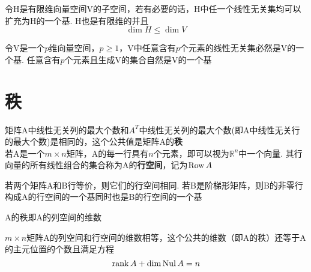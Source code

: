 \begin{TheoremOne}
令H是有限维向量空间V的子空间，若有必要的话，H中任一个线性无关集均可以扩充为H的一个基. H也是有限维的并且
\[\dim H\leqslant\dim V\]
\end{TheoremOne}\vspace{4ex}

\begin{TheoremTwo}[基定理]
令V是一个$p$维向量空间，$p\geqslant 1$，V中任意含有$p$个元素的线性无关集必然是V的一个基. 任意含有$p$个元素且生成V的集合自然是V的一个基
\end{TheoremTwo}\vspace{4ex}

{\par\centering
{}
\par}\vspace{4ex}

\section{秩}
矩阵A中线性无关列的最大个数和$A^T$中线性无关列的最大个数(即A中线性无关行的最大个数)是相同的，这个公共值是矩阵A的\textbf{秩}\\[2ex]

若A是一个$m\times n$矩阵，A的每一行具有$n$个元素，即可以视为$\mathbb{R}^n$中一个向量. 其行向量的所有线性组合的集合称为A的\textbf{行空间}，记为$\operatorname{Row} A$\\[2ex]

\begin{TheoremOne}
若两个矩阵A和B行等价，则它们的行空间相同. 若B是阶梯形矩阵，则B的非零行构成A的行空间的一个基同时也是B的行空间的一个基
\end{TheoremOne}\vspace{4ex}

\begin{definition}
A的秩即A的列空间的维数
\end{definition}\vspace{4ex}

\begin{TheoremTwo}[秩定理]
$m\times n$矩阵A的列空间和行空间的维数相等，这个公共的维数（即A的秩）还等于A的主元位置的个数且满足方程
\[\operatorname{rank} A+\dim\operatorname{Nul} A=n\]
\end{TheoremTwo}\vspace{4ex}

